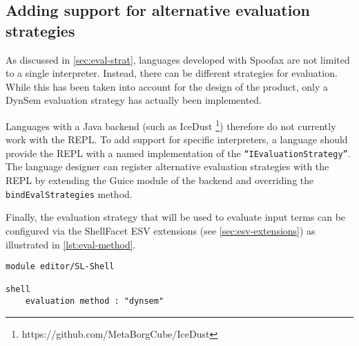 \subsection{Adding support for alternative evaluation strategies}
\label{sec:discuss-alternate-eval}

As discussed in \cref{sec:eval-strat}, languages developed with Spoofax are not
limited to a single interpreter. Instead, there can be different strategies for
evaluation. While this has been taken into account for the design of the
product, only a DynSem evaluation strategy has actually been implemented.

Languages with a Java backend (such as IceDust%
\footnote{https://github.com/MetaBorgCube/IceDust}) therefore do not currently
work with the REPL. To add support for specific interpreters, a language should
provide the REPL with a named implementation of the
\texttt{``IEvaluationStrategy''}. The language designer can register alternative
evaluation strategies with the REPL by extending the Guice module of the backend
and overriding the \texttt{bindEvalStrategies} method.

Finally, the evaluation strategy that will be used to evaluate input terms can
be configured via the ShellFacet ESV extensions (see \cref{sec:esv-extensions})
as illustrated in \cref{lst:eval-method}.

\begin{lstlisting}[language=esv,caption={Setting the evaluation strategy.},label={lst:eval-method}]
module editor/SL-Shell

shell
    evaluation method : "dynsem"
\end{lstlisting}

